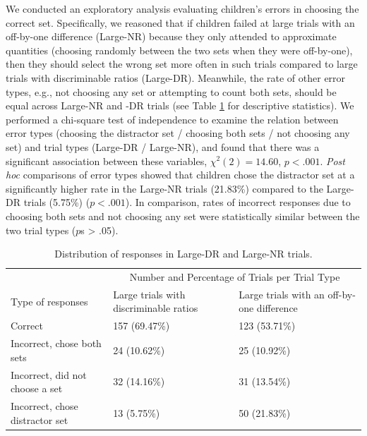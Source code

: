 \documentclass[
  man,floatsintext]{apa7}
\begin{document}
We conducted an exploratory analysis evaluating children's errors in choosing the correct set. Specifically, we reasoned that if children failed at large trials with an off-by-one difference (Large-NR) because they only attended to approximate quantities (choosing randomly between the two sets when they were off-by-one), then they should select the wrong set more often in such trials compared to large trials with discriminable ratios (Large-DR). Meanwhile, the rate of other error types, e.g., not choosing any set or attempting to count both sets, should be equal across Large-NR and -DR trials (see Table \ref{tab:table2} for descriptive statistics). We performed a chi-square test of independence to examine the relation between error types (choosing the distractor set / choosing both sets / not choosing any set) and trial types (Large-DR / Large-NR), and found that there was a significant association between these variables, \(\chi^2(2) = 14.60\), \(p < .001\). \emph{Post hoc} comparisons of error types showed that children chose the distractor set at a significantly higher rate in the Large-NR trials (21.83\%) compared to the Large-DR trials (5.75\%) (\(p < .001\)). In comparison, rates of incorrect responses due to choosing both sets and not choosing any set were statistically similar between the two trial types (\(p\)s \textgreater{} .05).

\begin{table}[tbp]

\begin{center}
\begin{threeparttable}

\caption{\label{tab:table2}Distribution of responses in Large-DR and Large-NR trials.}

\begin{tabular}{m{6cm}m{4.5cm}m{4.5cm}}
\toprule
 & \multicolumn{2}{c}{Number and Percentage of Trials per Trial Type} \\
\cmidrule(r){2-3}
Type of responses & Large trials with discriminable ratios & Large trials with an off-by-one difference\\
\midrule
Correct & 157 (69.47\%) & 123 (53.71\%)\\
Incorrect, chose both sets & 24 (10.62\%) & 25 (10.92\%)\\
Incorrect, did not choose a set & 32 (14.16\%) & 31 (13.54\%)\\
Incorrect, chose distractor set & 13 (5.75\%) & 50 (21.83\%)\\
\bottomrule
\end{tabular}

\end{threeparttable}
\end{center}

\end{table}
\end{document}
